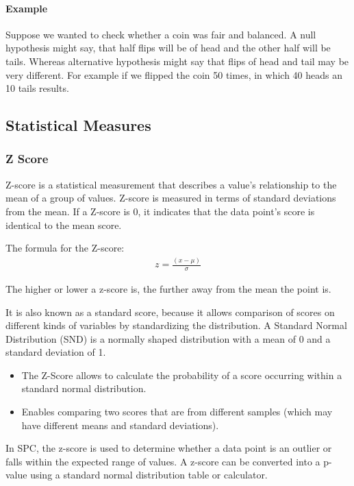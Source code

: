 \documentclass[11pt]{article}
\begin{document}
\hypertarget{example}{%
\paragraph{Example}\label{example}}
Suppose we wanted to check whether a coin was fair and balanced. A null
hypothesis might say, that half flips will be of head and the other half
will be tails. Whereas alternative hypothesis might say that flips of
head and tail may be very different.
For example if we flipped the coin 50 times, in which 40 heads an 10
tails results.

\hypertarget{statistical-measures}{%
\subsection{Statistical Measures}\label{statistical-measures}}

\hypertarget{z-score}{%
\subsubsection{Z Score}\label{z-score}}

Z-score is a statistical measurement that describes a value's
relationship to the mean of a group of values. Z-score is measured in
terms of standard deviations from the mean. If a Z-score is 0, it
indicates that the data point's score is identical to the mean score.

The formula for the Z-score: 
\begin{gather}
  z=\frac{(x-\mu)}{\sigma}
\end{gather}


The higher or lower a z-score is, the further away from the mean the
point is.

It is also known as a standard score, because it allows comparison of
scores on different kinds of variables by standardizing the
distribution. A Standard Normal Distribution (SND) is a normally shaped
distribution with a mean of 0 and a standard deviation of 1.

\begin{itemize}
\item
  The Z-Score allows to calculate the probability of a score occurring
  within a standard normal distribution.
\item
  Enables comparing two scores that are from different samples (which
  may have different means and standard deviations).
\end{itemize}

In SPC, the z-score is used to determine whether a data point is an
outlier or falls within the expected range of values. A z-score can be
converted into a p-value using a standard normal distribution table or
calculator.
\end{document}
